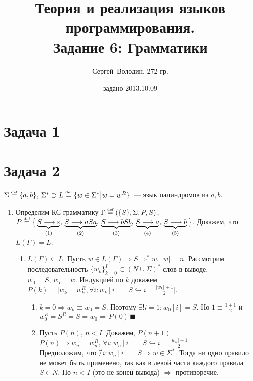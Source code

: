 \documentclass[a4paper]{article}
\title{Теория и реализация языков программирования.\\Задание 6: Грамматики}
\date{задано 2013.10.09}
\author{Сергей~Володин, 272 гр.}
\def\eqdef{\overset{\mbox{\tiny def}}{=}}
\begin{document}
\maketitle
\section*{Задача 1}
\section*{Задача 2}
$\Sigma\eqdef\{a,b\}$, $\Sigma^*\supset L\eqdef\{w\in\Sigma^*\big|w=w^R\}$~--- язык палиндромов из $a,b$.
\begin{enumerate}
\def\ansba{$\Gamma\eqdef(\{S\},\Sigma,P,S)$, $P\eqdef\big\{\underbrace{S\longrightarrow\varepsilon}_{(1)},\,\underbrace{S\longrightarrow aSa}_{(2)},\,\underbrace{S\longrightarrow bSb}_{(3)},\,\underbrace{S\longrightarrow a}_{(4)},\,\underbrace{S\longrightarrow b}_{(5)}\big\}$}
\def\ansbac{\Gamma\eqdef(\{S\},\Sigma,P,S)$, $P\eqdef\big\{S\longrightarrow\varepsilon\big|aSa\big|bSb\big|a\big|b\big\}}
\item Определим КС-грамматику \ansba.\newline
Докажем, что $L(\Gamma)=L$:
\begin{enumerate}
\item $L(\Gamma)\subseteq L$. Пусть $w\in L(\Gamma)\Rightarrow S\Longrightarrow^* w$. $|w|=n$. Рассмотрим последовательность $\{w_k\}^I_{k=0}\subset (N\cup\Sigma)^*$ слов в выводе. $w_0=S,\,w_I=w$. Индукцией по $k$ докажем $P(k)=\big[w_k=w_k^R,\forall i\colon w_k[i]=S\hookrightarrow i=\frac{|w_k|+1}{2}\big]$.\begin{enumerate}[1.]
\item $k=0\Rightarrow w_k\equiv w_0=S$. Поэтому $\exists ! i=1\colon w_0[i]=S$. Но $1\equiv\frac{1+1}{2}$ и $w_0^R=S^R=S=w_0\Rightarrow P(0)\,\blacksquare$
\item Пусть $P(n),\,n<I$. Докажем, $P(n+1)$. $P(n)\Rightarrow w_n=w_n^R,\,\forall i\colon w_n[i]=S\hookrightarrow i=\frac{|w_n|+1}{2}$.
\\[1pt]
Предположим, что $\nexists i\colon w_n[i]=S\Rightarrow w\in \Sigma^*$. Тогда ни одно правило не может быть применено, так как в левой части каждого правила $S\in N$. Но $n<I$ (это не конец вывода) $\Rightarrow$ противоречие.

\end{enumerate}
\end{enumerate}
\end{enumerate}
\end{document}

